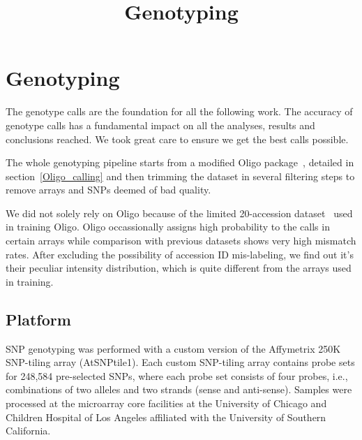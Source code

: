 \documentclass[a4paper,10pt]{article}
\title{Genotyping}
\begin{document}
\maketitle

\begin{abstract}

\end{abstract}

\tableofcontents

\section{Genotyping}
The genotype calls are the foundation for all the following work. The accuracy of genotype calls has a fundamental impact on all the analyses, results and conclusions reached. We took great care to ensure we get the best calls possible.

The whole genotyping pipeline starts from a modified Oligo package~\cite{Carvalho2007}, detailed in section~\ref{Oligo_calling} and then trimming the dataset in several filtering steps to remove arrays and SNPs deemed of bad quality.

We did not solely rely on Oligo because of the limited 20-accession dataset~\cite{Clark2007a} used in training Oligo. Oligo occassionally assigns high probability to the calls in certain arrays while comparison with previous datasets shows very high mismatch rates. After excluding the possibility of accession ID mis-labeling, we find out it's their peculiar intensity distribution, which is quite different from the arrays used in training.

\subsection{Platform}
SNP genotyping was performed with a custom version of the Affymetrix 250K SNP-tiling array (AtSNPtile1). Each custom SNP-tiling array contains probe sets for 248,584 pre-selected SNPs, where each probe set consists of four probes, i.e., combinations of two alleles and two strands (sense and anti-sense). Samples were processed at the microarray core facilities at the University of Chicago and Children Hospital of Los Angeles affiliated with the University of Southern California.
\end{document}
